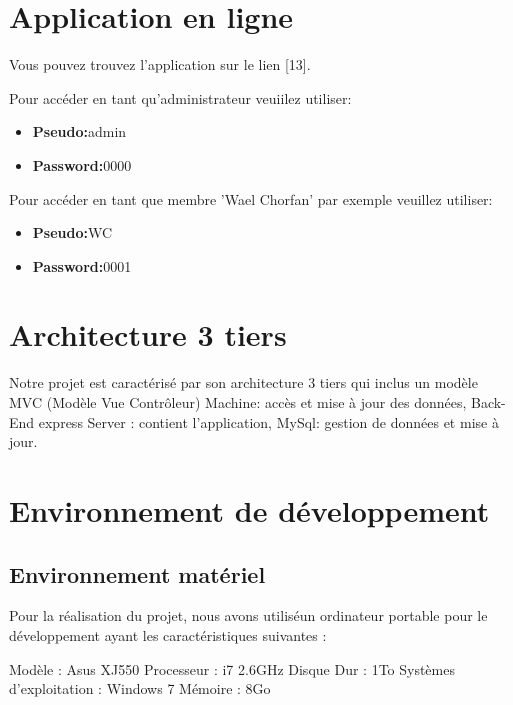 \section{Application en ligne}
Vous pouvez trouvez l'application sur le lien [13].


  Pour acc\'{e}der en tant qu'administrateur veuiilez utiliser:

  \begin{itemize}
    \item {\textbf{ Pseudo:}admin}
    \item {\textbf{ Password:}0000}
  \end{itemize}


  Pour acc\'{e}der en tant que membre 'Wael Chorfan' par exemple veuillez utiliser:

  \begin{itemize}
    \item {\textbf{ Pseudo:}WC}
    \item {\textbf{ Password:}0001}
  \end{itemize}

 \newpage



 \section{ Architecture 3 tiers}

Notre projet est caract\'{e}ris\'{e} par son architecture 3 tiers qui inclus un mod\`{e}le MVC (Mod\`{e}le
Vue Contr\^{o}leur)
\textbullet{} Machine: acc\`{e}s et mise \`{a} jour des donn\'{e}es,
\textbullet{} Back-End express Server : contient l'application,
\textbullet{} MySql: gestion de donn\'{e}es et mise \`{a} jour.


\section{Environnement de d\'{e}veloppement}

  \subsection{Environnement mat\'{e}riel }

  Pour la r\'{e}alisation du projet, nous avons utilis\'{e}un ordinateur
  portable pour le d\'{e}veloppement ayant les caract\'{e}ristiques suivantes :

\textbullet{} Mod\`{e}le : Asus XJ550 \newline
\textbullet{} Processeur : i7 2.6GHz \newline
\textbullet{} Disque Dur : 1To  \newline
\textbullet{} Syst\`{e}mes d'exploitation : Windows 7  \newline
\textbullet{} M\'{e}moire : 8Go  \newline


